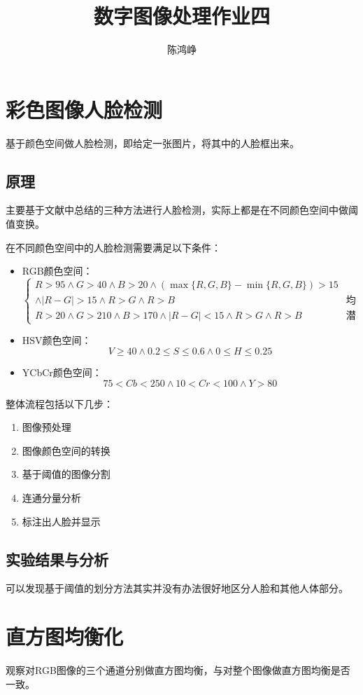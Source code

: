 \documentclass[logo,reportComp]{thesis}
\title{数字图像处理作业四}
\subtitle{}
\author{陈鸿峥}
\begin{document}
\maketitle

\section{彩色图像人脸检测}
基于颜色空间做人脸检测，即给定一张图片，将其中的人脸框出来。

\subsection{原理}
主要基于文献\cite{bib:face_recog}中总结的三种方法进行人脸检测，实际上都是在不同颜色空间中做阈值变换。

在不同颜色空间中的人脸检测需要满足以下条件：
\begin{itemize}
	\item RGB颜色空间：
	\[\begin{cases}
	R>95\land G>40\land B>20\land (\max\{R,G,B\}-\min\{R,G,B\})>15\\
	\land |R-G|>15 \land R>G \land R>B & \text{均匀照明}\\
	R>20\land G>210\land B>170\land |R-G|<15 \land R>G \land R>B & \text{潜在照明}
	\end{cases}\]
	\item HSV颜色空间：
	\[V\geq 40\land 0.2\leq S\leq 0.6\land 0\leq H\leq 0.25\]
	\item YCbCr颜色空间：
	\[75<Cb<250\land 10<Cr<100\land Y>80\]
\end{itemize}

整体流程包括以下几步：
\begin{enumerate}
	\item 图像预处理
	\item 图像颜色空间的转换
	\item 基于阈值的图像分割
	\item 连通分量分析
	\item 标注出人脸并显示
\end{enumerate}

\subsection{实验结果与分析}
可以发现基于阈值的划分方法其实并没有办法很好地区分人脸和其他人体部分。


\section{直方图均衡化}
观察对RGB图像的三个通道分别做直方图均衡，与对整个图像做直方图均衡是否一致。
\end{document}
